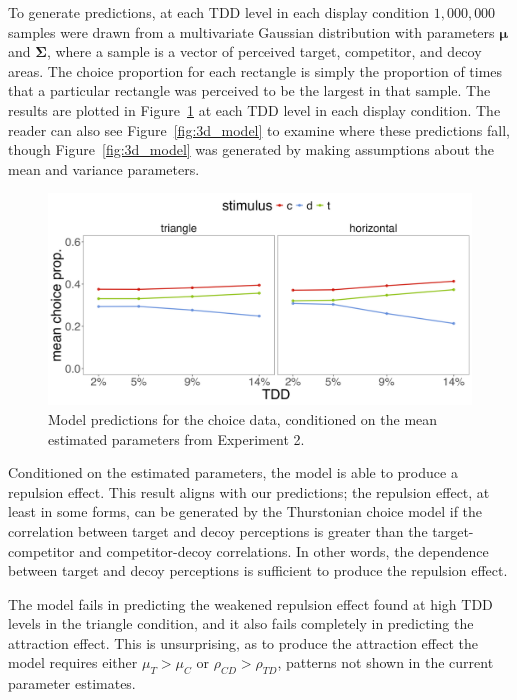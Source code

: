 To generate predictions, at each TDD level in each display condition $1,000,000$ samples were drawn from a multivariate Gaussian distribution with parameters $\boldsymbol{\mu}$ and $\boldsymbol{\Sigma}$, where a sample is a vector of perceived target, competitor, and decoy areas. The choice proportion for each rectangle is simply the proportion of times that a particular rectangle was perceived to be the largest in that sample. The results are plotted in Figure~\ref{fig:e2_model_preds} at each TDD level in each display condition. The reader can also see Figure~\ref{fig:3d_model} to examine where these predictions fall, though Figure~\ref{fig:3d_model} was generated by making assumptions about the mean and variance parameters. 

\begin{figure}
   \includegraphics[width=\textwidth]{figures/bayes_circle_area_sim_choice_sigma_constant_comp_effect.jpeg}
   \caption{Model predictions for the choice data, conditioned on the mean estimated parameters from Experiment 2.}
   \label{fig:e2_model_preds}
\end{figure}

Conditioned on the estimated parameters, the model is able to produce a repulsion effect. This result aligns with our predictions; the repulsion effect, at least in some forms, can be generated by the Thurstonian choice model if the correlation between target and decoy perceptions is greater than the target-competitor and competitor-decoy correlations. In other words, the dependence between target and decoy perceptions is sufficient to produce the repulsion effect.

The model fails in predicting the weakened repulsion effect found at high TDD levels in the triangle condition, and it also fails completely in predicting the attraction effect. This is unsurprising, as to produce the attraction effect the model requires either $\mu_{T}>\mu_{C}$ or $\rho_{CD}>\rho_{TD}$, patterns not shown in the current parameter estimates. 

